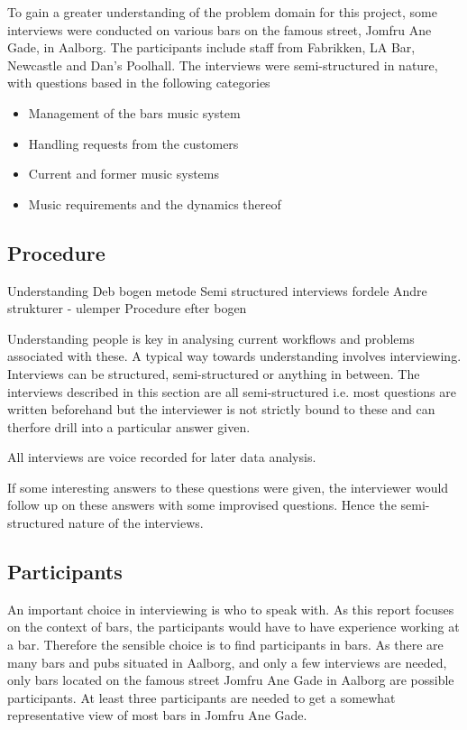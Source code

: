 \label{interviews}

To gain a greater understanding of the problem domain for this project, some interviews were conducted on various bars on the famous street, Jomfru Ane Gade, in Aalborg. The participants include staff from Fabrikken, LA Bar, Newcastle and Dan's Poolhall. The interviews were semi-structured in nature, with questions based in the following categories

\begin{itemize}
  \item Management of the bars music system
  \item Handling requests from the customers
  \item Current and former music systems
  \item Music requirements and the dynamics thereof
\end{itemize}

\subsection{Procedure}
\label{sub:procedure}

Understanding
Deb bogen metode
Semi structured interviews fordele
Andre strukturer - ulemper
Procedure efter bogen

Understanding people is key in analysing current workflows and problems associated with these. A typical way towards understanding involves interviewing. Interviews can be structured, semi-structured or anything in between. The interviews described in this section are all semi-structured i.e. most questions are written beforehand but the interviewer is not strictly bound to these and can therfore drill into a particular answer given.

All interviews are voice recorded for later data analysis.


If some interesting answers to these questions were given, the interviewer would follow up on these answers with some improvised questions. Hence the semi-structured nature of the interviews.

\subsection{Participants}

An important choice in interviewing is who to speak with. As this report focuses on the context of bars, the participants would have to have experience working at a bar. Therefore the sensible choice is to find participants in bars. As there are many bars and pubs situated in Aalborg, and only a few interviews are needed, only bars located on the famous street Jomfru Ane Gade in Aalborg are possible participants. At least three participants are needed to get a somewhat representative view of most bars in Jomfru Ane Gade.

